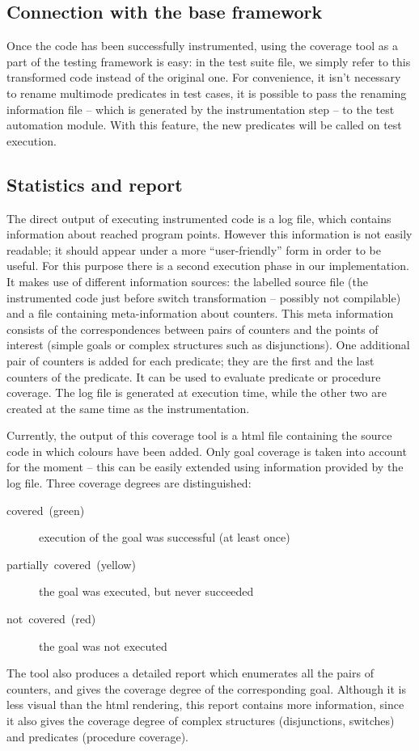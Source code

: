 \documentclass[british]{llncs}
\begin{document}
\subsection{Connection with the base framework}

Once the code has been successfully instrumented, using the coverage
tool as a part of the testing framework is easy: in the test suite
file, we simply refer to this transformed code instead of the original
one. For
convenience, it isn't necessary to rename multimode predicates in
test cases, it is possible to pass the renaming information file --
which is generated by the instrumentation step -- to the test automation
module. With this feature, the new predicates will be called on test
execution.


\subsection{Statistics and report}

The direct output of executing instrumented code is a log file, which
contains information about reached program points. However this information is not easily readable; it should appear under a more ``user-friendly'' form in order to be useful. For this purpose there is a second execution phase in our implementation. It makes use of different information sources: the labelled source file (the instrumented code just
before switch transformation -- possibly not compilable) and a file containing meta-information about counters. This meta information consists of the correspondences between pairs of counters and the points of interest (simple goals or complex structures such as disjunctions). One additional
pair of counters is added for each predicate; they are the first and the last counters of the predicate. It can be used to evaluate
predicate or procedure coverage. The log file is generated at execution
time, while the other two are created at the same time as the instrumentation.

Currently, the output of this coverage tool is a html file containing the source code in which colours have been added. Only goal coverage is taken into account for the moment -- this can be easily extended using information provided by the log file. Three coverage degrees are distinguished: 
\begin{description}
\item [{covered~(green)}] execution of the goal was successful (at least once) 
\item [{partially~covered~(yellow)}] the goal was executed, but never succeeded 
\item [{not~covered~(red)}] the goal was not executed 
\end{description}
The tool also produces a detailed report which enumerates
all the pairs of counters, and gives the coverage degree of the corresponding
goal. Although it is less visual than the html rendering, this report contains more information, since it also gives the coverage degree of complex structures (disjunctions, switches) and predicates (procedure coverage).
\end{document}
